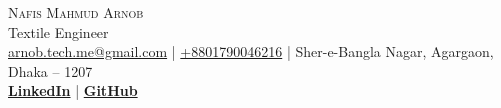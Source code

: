 
\begin{center}

    {\Huge \scshape {Nafis Mahmud Arnob}}\\
    \vspace{2mm}
     {\large Textile Engineer} \\
    \vspace{2mm}
    \href{mailto:arnob.tech.me@gmail.com}{arnob.tech.me@gmail.com} | \href{tel:+8801790046216}{+8801790046216} | Sher-e-Bangla Nagar, Agargaon, Dhaka – 1207\\
    \vspace{1mm}
    \textbf{\href{https://www.linkedin.com/in/arnob-mahmud/}{LinkedIn}} | \textbf{\href{https://www.github.com/ArnobMahmud}{GitHub}}\\

  \end{center}